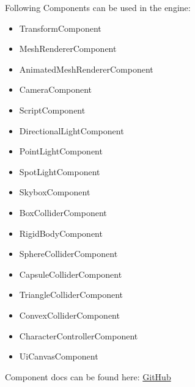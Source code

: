 \documentclass{article}
\begin{document}
    Following Components can be used in the engine:

    \begin{itemize}
        \item TransformComponent
        \item MeshRendererComponent
        \item AnimatedMeshRendererComponent
        \item CameraComponent
        \item ScriptComponent
        \item DirectionalLightComponent
        \item PointLightComponent
        \item SpotLightComponent
        \item SkyboxComponent
        \item BoxColliderComponent
        \item RigidBodyComponent
        \item SphereColliderComponent
        \item CapsuleColliderComponent
        \item TriangleColliderComponent
        \item ConvexColliderComponent
        \item CharacterControllerComponent
        \item UiCanvasComponent
    \end{itemize}

    Component docs can be found here: \href{https://github.com/Liioooo/cgue23-pac3D/blob/master/docs/md/COMPONENTS_DOCS.md}{GitHub}
\end{document}
